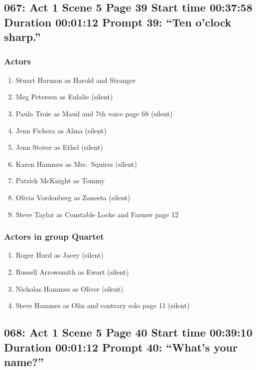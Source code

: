 \subsection{067: Act 1 Scene 5 Page 39 Start time 00:37:58 Duration 00:01:12 Prompt 39: ``Ten o'clock sharp.''}

\subsubsection{Actors}
\begin{enumerate}
\item Stuart Harmon as Harold and Stranger
\item Meg Petersen as Eulalie (silent)
\item Paula Troie as Maud and 7th voice page 68 (silent)
\item Jenn Fichera as Alma (silent)
\item Jenn Stover as Ethel (silent)
\item Karen Hammes as Mrs.~Squires (silent)
\item Patrick McKnight as Tommy
\item Olivia Vordenberg as Zaneeta (silent)
\item Steve Taylor as Constable Locke and Farmer page 12
\end{enumerate}
\subsubsection{Actors in group Quartet}
\begin{enumerate}
\item Roger Hurd as Jacey (silent)
\item Russell Arrowsmith as Ewart (silent)
\item Nicholas Hammes as Oliver (silent)
\item Steve Hammes as Olin and contrary solo page 11 (silent)
\end{enumerate}


\subsection{068: Act 1 Scene 5 Page 40 Start time 00:39:10 Duration 00:01:12 Prompt 40: ``What's your name?''}

